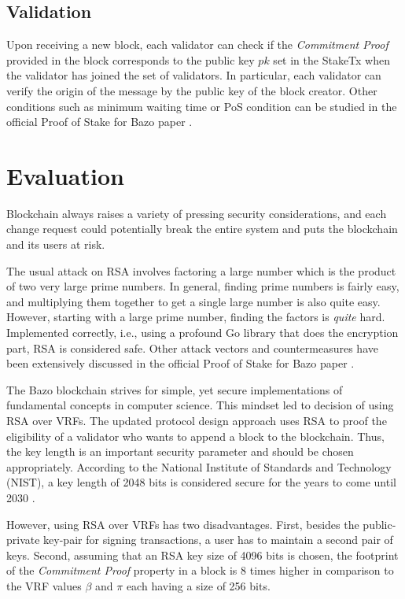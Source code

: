 \documentclass[12pt,a4]{article}
\begin{document}
\subsection{Validation}

Upon receiving a new block, each validator can check if the \textit{Commitment Proof} provided in the block corresponds to the public key $pk$ set in the StakeTx when the validator has joined the set of validators. In particular, each validator can verify the origin of the message by the public key of the block creator. Other conditions such as minimum waiting time or PoS condition can be studied in the official Proof of Stake for Bazo paper \cite{Bachmann18}.

\section{Evaluation}

Blockchain always raises a variety of pressing security considerations, and each change request could potentially break the entire system and puts the blockchain and its users at risk.

The usual attack on RSA involves factoring a large number which is the product of two very large prime numbers. In general, finding prime numbers is fairly easy, and multiplying them together to get a single large number is also quite easy. However, starting with a large prime number, finding the factors is \textit{quite} hard. Implemented correctly, i.e., using a profound Go library that does the encryption part, RSA is considered safe. Other attack vectors and countermeasures have been extensively discussed in the official Proof of Stake for Bazo paper \cite{Bachmann18}.

The Bazo blockchain strives for simple, yet secure implementations of fundamental concepts in computer science. This mindset led to decision of using RSA over VRFs. The updated protocol design approach uses RSA to proof the eligibility of a validator who wants to append a block to the blockchain. Thus, the key length is an important security parameter and should be chosen appropriately. According to the National Institute of Standards and Technology (NIST), a key length of 2048 bits is considered secure for the years to come until 2030 \cite{BlueKrypt}.

However, using RSA over VRFs has two disadvantages. First, besides the public-private key-pair for signing transactions, a user has to maintain a second pair of keys. Second, assuming that an RSA key size of 4096 bits is chosen, the footprint of the \textit{Commitment Proof} property in a block is 8 times higher in comparison to the VRF values $\beta$ and $\pi$ each having a size of 256 bits.
\end{document}

